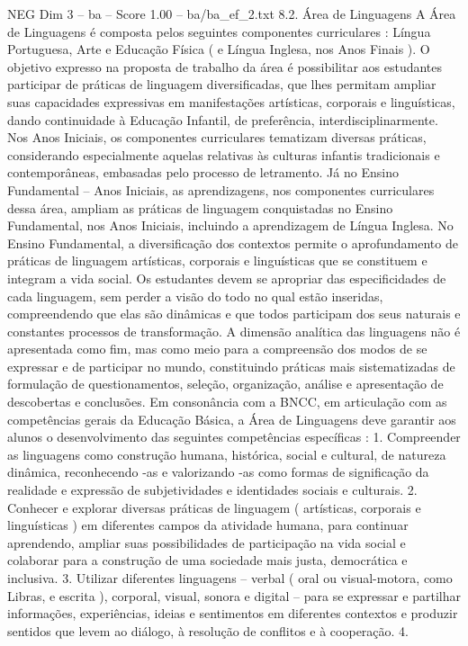 \begin{textsample}{NEG Dim 3 – ba – Score 1.00 – ba/ba\_ef\_2.txt}  \label{ex:f3_neg_112}
8.2.
Área de Linguagens A Área de Linguagens é composta pelos seguintes componentes curriculares : Língua Portuguesa, Arte e Educação Física ( e Língua Inglesa, nos Anos Finais ).
O objetivo expresso na proposta de trabalho da área é possibilitar aos estudantes participar de práticas de linguagem diversificadas, que lhes permitam ampliar suas capacidades expressivas em manifestações artísticas, corporais e linguísticas, dando continuidade à Educação Infantil, de preferência, interdisciplinarmente.
Nos Anos Iniciais, os componentes curriculares tematizam diversas práticas, considerando especialmente aquelas relativas às culturas infantis tradicionais e contemporâneas, embasadas pelo processo de letramento.
Já no Ensino Fundamental – Anos Iniciais, as aprendizagens, nos componentes curriculares dessa área, ampliam as práticas de linguagem conquistadas no Ensino Fundamental, nos Anos Iniciais, incluindo a aprendizagem de Língua Inglesa.
No Ensino Fundamental, a diversificação dos contextos permite o aprofundamento de práticas de linguagem artísticas, corporais e linguísticas que se constituem e integram a vida social.
Os estudantes devem se apropriar das especificidades de cada linguagem, sem perder a visão do todo no qual estão inseridas, compreendendo que elas são dinâmicas e que todos participam dos seus naturais e constantes processos de transformação.
A dimensão analítica das linguagens não é apresentada como fim, mas como meio para a compreensão dos modos de se expressar e de participar no mundo, constituindo práticas mais sistematizadas de formulação de questionamentos, seleção, organização, análise e apresentação de descobertas e conclusões.
Em consonância com a BNCC, em articulação com as competências gerais da Educação Básica, a Área de Linguagens deve garantir aos alunos o desenvolvimento das seguintes competências específicas : 1.
Compreender as linguagens como construção humana, histórica, social e cultural, de natureza dinâmica, reconhecendo -as e valorizando -as como formas de significação da realidade e expressão de subjetividades e identidades sociais e culturais. 2.
Conhecer e explorar diversas práticas de linguagem ( artísticas, corporais e linguísticas ) em diferentes campos da atividade humana, para continuar aprendendo, ampliar suas possibilidades de participação na vida social e colaborar para a construção de uma sociedade mais justa, democrática e inclusiva. 3.
Utilizar diferentes linguagens – verbal ( oral ou visual-motora, como Libras, e escrita ), corporal, visual, sonora e digital – para se expressar e partilhar informações, experiências, ideias e sentimentos em diferentes contextos e produzir sentidos que levem ao diálogo, à resolução de conflitos e à cooperação. 4.

\end{textsample}
